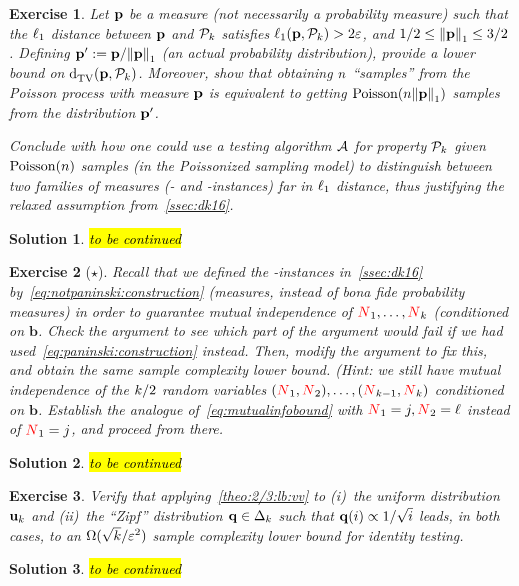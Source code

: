 \documentclass[biber]{nowfnt} %
\newtheorem{question}{Exercise}[chapter]
\newtheorem{solution}{Solution}[chapter]
\newcommand{\tbc}{\noindent\hl{\sc{}to be continued}\xspace}
\newcommand{\tbc}{}
\newcommand{\occur}{\textcolor{red}{N}}
\newcommand{\occur}{N}
\begin{document}
\begin{question}\label{exo:notrealproba:lb}
Let $\p$ be a measure (not necessarily a probability measure) such that the $\lp[1]$ distance between $\p$ and $\property_\ab$ satisfies $\lp[1](\p,\property_\ab)>2\dst$, and $1/2\leq \normone{\p} \leq 3/2$. Defining $\p' \eqdef \p/\normone{\p}$ (an actual probability distribution), provide a lower bound on $\totalvardist{\p}{\property_\ab}$. Moreover, show that obtaining $\ns$ ``samples'' from the Poisson process with measure $\p$ is equivalent to getting $\poisson{\ns\normone{\p}}$ samples from the distribution $\p'$.

Conclude with how one could use a testing algorithm $\Algo$ for property $\property_\ab$ given $\poisson{\ns}$ samples (\ie in the Poissonized sampling model) to distinguish between two families of measures (\yes- and \no-instances) far in $\lp[1]$ distance, thus justifying the relaxed assumption from~\cref{ssec:dk16}.
\end{question}
\begin{solution}
\tbc
\end{solution}

\begin{question}[$\star$]\label{exo:paninski:mi:lb}
Recall that we defined the \no-instances in~\cref{ssec:dk16} by~\cref{eq:notpaninski:construction} (measures, instead of \emph{bona fide} probability measures) in order to guarantee mutual independence of $\occur_1,\dots,\occur_\ab$ (conditioned on $\mathbf{b}$. Check the argument to see which part of the argument would fail if we had used~\cref{eq:paninski:construction} instead. Then, modify the argument to fix this, and obtain the same sample complexity lower bound. \textit{(Hint: we still have mutual independence of the $\ab/2$ random variables $(\occur_1, \occur_2),\dots,(\occur_{\ab-1}, \occur_\ab)$ conditioned on $\mathbf{b}$. Establish the analogue of~\cref{eq:mutualinfobound} with $\occur_1=j,\occur_2=\ell$ instead of $\occur_1=j$, and proceed from there.}
\end{question}
\begin{solution}
\tbc
\end{solution}

\begin{question}\label{ex:2/3:lb:applications}
Verify that applying~\cref{theo:2/3:lb:vv} to (i)~the uniform distribution $\uniform_\ab$ and (ii)~the ``Zipf'' distribution $\q\in\distribs{\ab}$ such that $\q(i) \propto 1/\sqrt{i}$ leads, in both cases, to an $\Omega(\sqrt{\ab}/\dst^2)$ sample complexity lower bound for identity testing.
\end{question}
\begin{solution}
\tbc
\end{solution}
\end{document}
